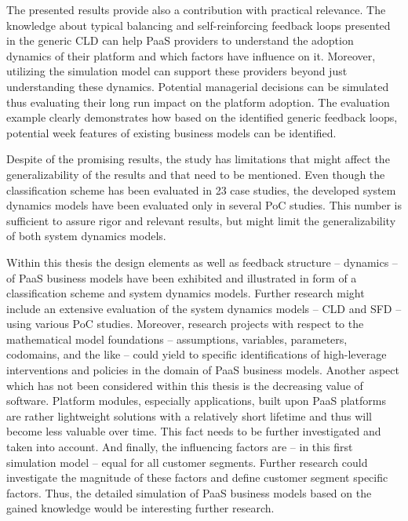 The presented results provide also a contribution with practical relevance. The knowledge about typical balancing and self-reinforcing feedback loops presented in the generic \ac{CLD} can help \ac{PaaS} providers to understand the adoption dynamics of their platform and which factors have influence on it. Moreover, utilizing the simulation model can support these providers beyond just understanding these dynamics. Potential managerial decisions can be simulated thus evaluating their long run impact on the platform adoption. The evaluation example clearly demonstrates how based on the identified generic feedback loops, potential week features of existing business models can be identified.

Despite of the promising results, the study has limitations that might affect the generalizability of the results and that need to be mentioned. Even though the classification scheme has been evaluated in 23 case studies, the developed system dynamics models have been evaluated only in several \acf{PoC} studies. This number is sufficient to assure rigor and relevant results, but might limit the generalizability of both system dynamics models.

Within this thesis the design elements as well as feedback structure -- dynamics -- of \ac{PaaS} business models have been exhibited and illustrated in form of a classification scheme and system dynamics models. Further research might include an extensive evaluation of the system dynamics models -- \ac{CLD} and \ac{SFD} -- using various \ac{PoC} studies. Moreover, research projects with respect to the mathematical model foundations -- assumptions, variables, parameters, codomains, and the like -- could yield to specific identifications of high-leverage interventions and policies in the domain of \ac{PaaS} business models. Another aspect which has not been considered within this thesis is the decreasing value of software. Platform modules, especially applications, built upon \ac{PaaS} platforms are rather lightweight solutions with a relatively short lifetime and thus will become less valuable over time. This fact needs to be further investigated and taken into account. And finally, the influencing factors are -- in this first simulation model -- equal for all customer segments. Further research could investigate the magnitude of these factors and define customer segment specific factors. Thus, the detailed simulation of \ac{PaaS} business models based on the gained knowledge would be interesting further research.
